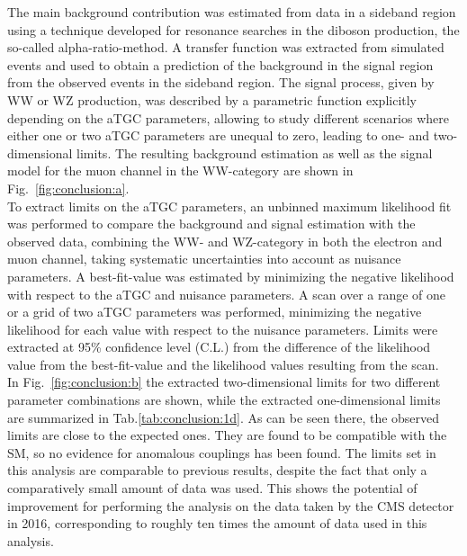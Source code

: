 The main background contribution was estimated from data in a sideband region using a technique developed for resonance searches in the diboson production, the so-called alpha-ratio-method. A transfer function was extracted from simulated events and used to obtain a prediction of the background in the signal region from the observed events in the sideband region. The signal process, given by WW or WZ production, was described by a parametric function explicitly depending on the aTGC parameters, allowing to study different scenarios where either one or two aTGC parameters are unequal to zero, leading to one- and two-dimensional limits. The resulting background estimation as well as the signal model for the muon channel in the WW-category are shown in Fig.~\ref{fig:conclusion:a}.\\

To extract limits on the aTGC parameters, an unbinned maximum likelihood fit was performed to compare the background and signal estimation with the observed data, combining the WW- and WZ-category in both the electron and muon channel, taking systematic uncertainties into account as nuisance parameters. A best-fit-value was estimated by minimizing the negative likelihood with respect to the aTGC and nuisance parameters. A scan over a range of one or a grid of two aTGC parameters was performed, minimizing the negative likelihood for each value with respect to the nuisance parameters. Limits were extracted at 95\% confidence level (C.L.) from the difference of the likelihood value from the best-fit-value and the likelihood values resulting from the scan.\\

In Fig.~\ref{fig:conclusion:b} the extracted two-dimensional limits for two different parameter combinations are shown, while the extracted one-dimensional limits are summarized in Tab.\ref{tab:conclusion:1d}. As can be seen there, the observed limits are close to the expected ones. They are found to be compatible with the SM, so no evidence for anomalous couplings has been found. The limits set in this analysis are comparable to previous results, despite the fact that only a comparatively small amount of data was used. This shows the potential of improvement for performing the analysis on the data taken by the CMS detector in 2016, corresponding to roughly ten times the amount of data used in this analysis.

